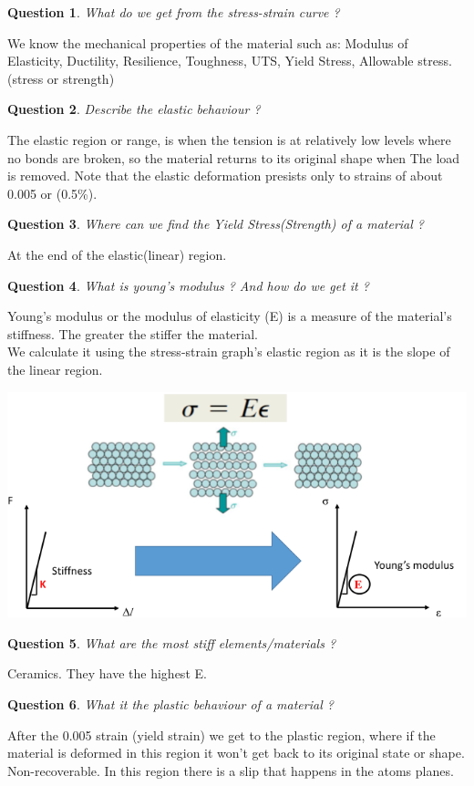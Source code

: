 \documentclass[13]{article}
\newtheorem{exer}{Question}
\begin{document}
\begin{exer}
What do we get from the stress-strain curve ?
\end{exer}
We know the mechanical properties of the material such as: Modulus of Elasticity, Ductility, Resilience, Toughness, UTS, Yield Stress, Allowable stress. (stress or strength)
\begin{exer}
Describe the elastic behaviour ?
\end{exer}
The elastic region or range, is when the tension is at relatively low levels where no bonds are broken, so the material returns to its original shape when The load is removed. Note that the elastic deformation presists only to strains of about 0.005 or (0.5\%).
\begin{exer}
	Where can we find the Yield Stress(Strength) of a material ?
\end{exer}
At the end of the elastic(linear) region.
\begin{exer}
What is young's modulus ? And how do we get it ?
\end{exer}
Young's modulus or the modulus of elasticity (E) is a measure of the material's stiffness. The greater the stiffer the material. \\
We calculate it using the stress-strain graph's elastic region as it is the slope of the linear region. 
\begin{center}
\includegraphics[scale=0.5]{figures/2.png}
\end{center}
\begin{exer}
What are the most stiff elements/materials ?
\end{exer}
Ceramics. They have the highest E.
\begin{exer}
What it the plastic behaviour of a material ?
\end{exer}
After the 0.005 strain (yield strain)  we get to the plastic region, where if the material is deformed in this region it won't get back to its original state or shape. Non-recoverable. In this region there is a slip that happens in the atoms planes.
\end{document}
